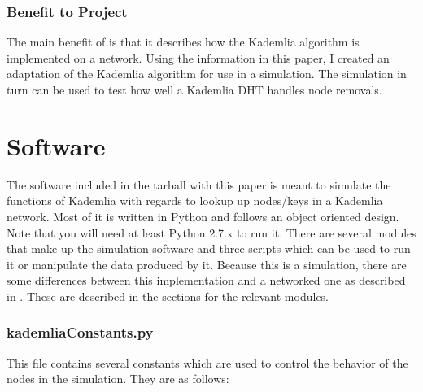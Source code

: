 \documentclass[notitlepage,12pt]{article}
\begin{document}
\subsubsection{Benefit to Project}
\label{sec:benp3}

The main benefit of \cite{kademlia} is that it describes how the Kademlia algorithm
is implemented on a network. Using the information in this paper, I created an
adaptation of the Kademlia algorithm for use in a simulation. The simulation in
turn can be used to test how well a Kademlia DHT handles node removals.

\section{Software}
\label{sec:software}

The software included in the tarball with this paper is meant to simulate the
functions of Kademlia with regards to lookup up nodes/keys in a Kademlia
network. Most of it is written in Python and follows an object oriented
design. Note that you will need at least Python 2.7.x to run it. There are
several modules that make up the simulation software and three scripts which can
be used to run it or manipulate the data produced by it. Because this is a
simulation, there are some differences between this implementation and a
networked one as described in \cite{kademlia}. These are described in the
sections for the relevant modules.

\subsubsection{kademliaConstants.py}
\label{sec:kadcontsts}

This file contains several constants which are used to control the
behavior of the nodes in the simulation. They are as follows:
\end{document}
